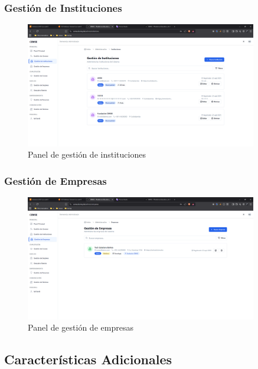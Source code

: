 \documentclass[12pt,a4paper]{article}
\begin{document}
\begin{enumerate}
\subsubsection{Gestión de Instituciones}
\begin{figure}[H]
    \centering
    \includegraphics[width=0.9\textwidth]{screenshots/admin/institution-management.png}
    \caption{Panel de gestión de instituciones}
    \label{fig:admin-institutions}
\end{figure}

\subsubsection{Gestión de Empresas}
\begin{figure}[H]
    \centering
    \includegraphics[width=0.9\textwidth]{screenshots/admin/company-management.png}
    \caption{Panel de gestión de empresas}
    \label{fig:admin-companies}
\end{figure}

\subsection{Características Adicionales}


\end{enumerate}
\end{document}
